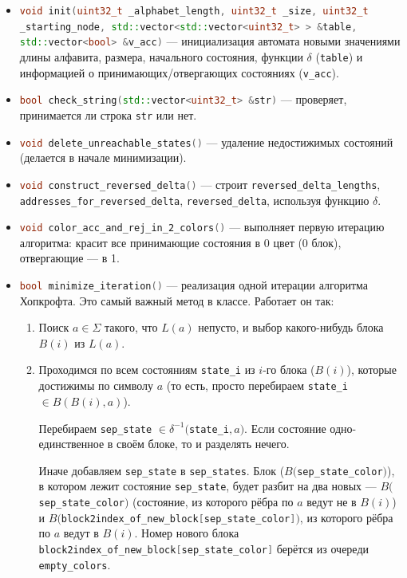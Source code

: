 \documentclass{article}
\begin{document}
\begin{itemize}
  \item[\ding{228}] \lstinline[language=C++]!void init(uint32_t _alphabet_length, uint32_t _size, uint32_t _starting_node, std::vector<std::vector<uint32_t> > &table, std::vector<bool> &v_acc)! --- инициализация автомата новыми значениями длины алфавита, размера, начального состояния, функции $\delta$ (\lstinline[language=C++]!table!) и информацией о принимающих/отвергающих состояниях (\lstinline[language=C++]!v_acc!).
  \item[\ding{228}] \lstinline[language=C++]!bool check_string(std::vector<uint32_t> &str)! --- проверяет, принимается ли строка \lstinline[language=C++]!str! или нет.
  \item[\ding{228}] \lstinline[language=C++]!void delete_unreachable_states()! --- удаление недостижимых состояний (делается в начале минимизации).
  \item[\ding{228}] \lstinline[language=C++]!void construct_reversed_delta()! --- строит \lstinline[language=C++]!reversed_delta_lengths!, \lstinline[language=C++]!addresses_for_reversed_delta!, \lstinline[language=C++]!reversed_delta!, используя функцию $\delta$.
  \item[\ding{228}] \lstinline[language=C++]!void color_acc_and_rej_in_2_colors()! --- выполняет первую итерацию алгоритма: красит все принимающие состояния в 0 цвет (0 блок), отвергающие --- в 1.
  \item[\ding{228}] \lstinline[language=C++]!bool minimize_iteration()! --- реализация одной итерации алгоритма Хопкрофта. Это самый важный метод в классе. Работает он так:
  \begin{enumerate}
    \item Поиск $a \in \Sigma$ такого, что $L(a)$ непусто, и выбор какого-нибудь блока $B(i)$ из $L(a)$.
    \item Проходимся по всем состояниям \lstinline[language=C++]!state_i! из $i$-го блока ($B(i)$), которые достижимы по символу $a$ (то есть, просто перебираем \lstinline[language=C++]!state_i! $\in \hat B(B(i), a)$).
    
    Перебираем \lstinline[language=C++]!sep_state! $\in \delta^{-1}($\lstinline[language=C++]!state_i!$, a)$. Если состояние одно-единственное в своём блоке, то и разделять нечего.
    
    Иначе добавляем \lstinline[language=C++]!sep_state! в \lstinline[language=C++]!sep_states!. Блок ($B($\lstinline[language=C++]!sep_state_color!$)$), в котором лежит состояние \lstinline[language=C++]!sep_state!, будет разбит на два новых --- $B($\lstinline[language=C++]!sep_state_color!$)$ (состояние, из которого рёбра по $a$ ведут не в $B(i)$) и $B($\lstinline[language=C++]!block2index_of_new_block[sep_state_color]!$)$, из которого рёбра по $a$ ведут в $B(i)$. Номер нового блока \lstinline[language=C++]!block2index_of_new_block[sep_state_color]! берётся из очереди \lstinline[language=C++]!empty_colors!.



\end{enumerate}
\end{itemize}
\end{document}

